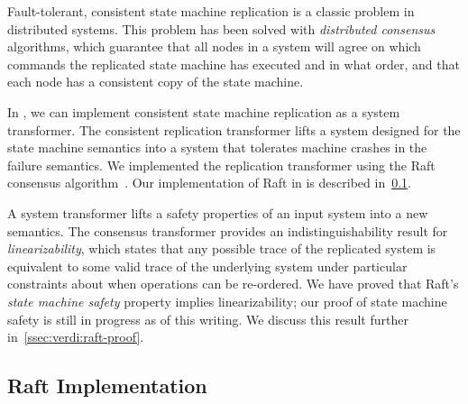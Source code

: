 Fault-tolerant, consistent state machine replication
is a classic problem in distributed systems.
This problem has been
solved with \textit{distributed consensus} algorithms, which guarantee
that all nodes in a system will agree on which commands the replicated
state machine has executed and in what order, and that each node has a
consistent copy of the state machine.

In \Verdi, we can implement consistent state machine replication as a
system transformer. The consistent replication transformer lifts a
system designed for the state machine semantics into a system that
tolerates machine crashes in the failure semantics. We implemented the
replication transformer using the Raft consensus
algorithm~\cite{ongaro:raft}. Our implementation of Raft in \Verdi is
described in~\cref{ssec:verdi:raft-impl}.

A \Verdi system transformer lifts a safety properties of an input
system into a new semantics. The consensus transformer provides an
indistinguishability result for \textit{linearizability}, which states
that any possible trace of the replicated system is equivalent to some
valid trace of the underlying system under particular constraints
about when operations can be re-ordered. We have proved that Raft's
\textit{state machine safety} property implies linearizability; our proof of
state machine safety is still in progress as of this writing.  We
discuss this result further in~\cref{ssec:verdi:raft-proof}.

\subsection{Raft Implementation}\label{ssec:verdi:raft-impl}


